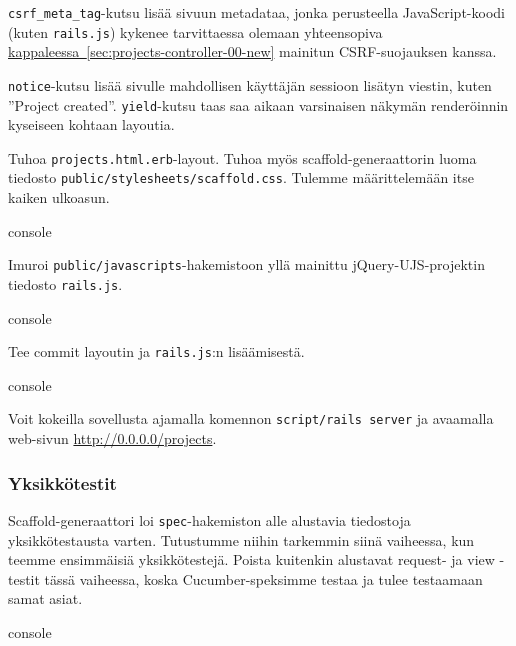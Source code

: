 \documentclass{article}
\newcommand{\myref}[2]{\hyperref[#2]{#1~\ref*{#2}}}
\newcommand{\pdfforeignlanguage}[2]{\texorpdfstring{\foreignlanguage{#1}{#2}}{#2}}
\newcommand{\eng}[1]{\pdfforeignlanguage{english}{#1}}
\begin{document}
\texttt{csrf\_meta\_tag}-kutsu lisää sivuun metadataa, jonka perusteella
JavaScript-koodi (kuten \texttt{rails.js}) kykenee tarvittaessa olemaan
yhteensopiva \myref{kappaleessa}{sec:projects-controller-00-new} mainitun
CSRF-suojauksen kanssa.

\texttt{notice}-kutsu lisää sivulle mahdollisen käyttäjän sessioon lisätyn
viestin, kuten ''Project created''. \texttt{yield}-kutsu taas saa aikaan
varsinaisen näkymän renderöinnin kyseiseen kohtaan layoutia.

\begin{samepage}
Tuhoa \texttt{projects.html.erb}-layout. Tuhoa myös
\eng{scaffold}-generaattorin luoma tiedosto
\texttt{public/stylesheets/scaffold.css}. Tulemme määrittelemään itse kaiken
ulkoasun.

\begin{pygmented}{console}
\end{pygmented}
\end{samepage}

\begin{samepage}
Imuroi \texttt{public/javascripts}-hakemistoon yllä mainittu
jQuery-UJS-projektin tiedosto \texttt{rails.js}.

\begin{pygmented}{console}
\end{pygmented}
\end{samepage}

\begin{samepage}
Tee commit layoutin ja \texttt{rails.js}:n lisäämisestä.

\begin{pygmented}{console}
\end{pygmented}
\end{samepage}

Voit kokeilla sovellusta ajamalla komennon \texttt{script/rails server} ja
avaamalla web-sivun \url{http://0.0.0.0/projects}.

\subsubsection{Yksikkötestit}

\begin{samepage}
\eng{Scaffold}-generaattori loi \texttt{spec}-hakemiston alle alustavia
tiedostoja yksikkötestausta varten. Tutustumme niihin tarkemmin siinä
vaiheessa, kun teemme ensimmäisiä yksikkötestejä. Poista kuitenkin alustavat
\eng{request}- ja \eng{view} -testit tässä vaiheessa, koska Cucumber-speksimme
testaa ja tulee testaamaan samat asiat.

\begin{pygmented}{console}
\end{pygmented}
\end{samepage}
\end{document}
